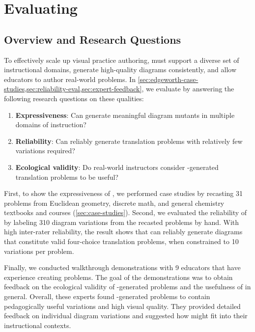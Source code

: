 \chapter{Evaluating \Edgeworth{}}
\label{chp:edgeworth-eval}

\section{Overview and Research Questions}

To effectively scale up visual practice authoring, \Edgeworth must support a diverse set of instructional domains, generate high-quality diagrams consistently, and allow educators to author real-world problems. In \cref{sec:edgeworth-case-studies,sec:reliability-eval,sec:expert-feedback}, we evaluate \Edgeworth by answering the following research questions on these qualities:

\begin{enumerate}[label=RQ\arabic*]
    \item\label{rq:dom} \textbf{Expressiveness}: Can \Edgeworth generate meaningful diagram mutants in multiple domains of instruction?
    \item\label{rq:mut} \textbf{Reliability}: Can \Edgeworth reliably generate translation problems with relatively few variations required?
    \item\label{rq:eco} \textbf{Ecological validity}: Do real-world instructors consider \Edgeworth-generated translation problems to be useful? 
\end{enumerate}

First, to show the expressiveness of \Edgeworth, we performed case studies by recasting 31 problems from Euclidean geometry, discrete math, and general chemistry textbooks and courses (\cref{sec:case-studies}). Second, we evaluated the reliability of \Edgeworth by labeling 310 diagram variations from the recasted problems by hand. With high inter-rater reliability, the result shows that \Edgeworth can reliably generate diagrams that constitute valid four-choice translation problems, when constrained to 10 variations per problem.

Finally, we conducted walkthrough demonstrations with 9 educators that have experience creating problems. The goal of the demonstrations was to obtain feedback on the ecological validity of \Edgeworth-generated problems and the usefulness of \Edgeworth in general. Overall, these experts found \Edgeworth-generated problems to contain pedagogically useful variations and high visual quality. They provided detailed feedback on individual diagram variations and suggested how \Edgeworth might fit into their instructional contexts. 


